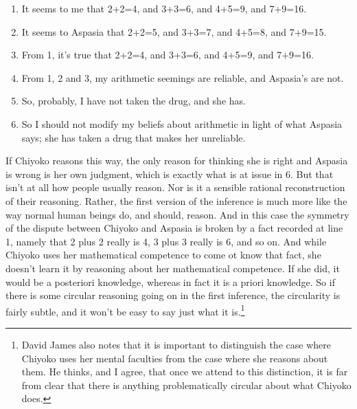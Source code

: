 \begin{enumerate}
\item{} It seems to me that 2+2=4, and 3+3=6, and 4+5=9, and 7+9=16.

\item{} It seems to \gls{Aspasia} that 2+2=5, and 3+3=7, and 4+5=8, and 7+9=15.

\item{} From 1, it's true that 2+2=4, and 3+3=6, and 4+5=9, and 7+9=16.

\item{} From 1, 2 and 3, my arithmetic seemings are reliable, and \gls{Aspasia}'s are not.

\item{} So, probably, I have not taken the drug, and she has.

\item{} So I should not modify my beliefs about arithmetic in light of what \gls{Aspasia} says; she has taken a drug that makes her unreliable.

\end{enumerate}
If \gls{Chiyoko} reasons this way, the only reason for thinking she is right and \gls{Aspasia} is wrong is her own judgment, which is exactly what is at issue in 6. But that isn't at all how people usually reason. Nor is it a sensible rational reconstruction of their reasoning. Rather, the first version of the inference is much more like the way normal human beings do, and should, reason. And in this case the symmetry of the dispute between \gls{Chiyoko} and \gls{Aspasia} is broken by a fact recorded at line 1, namely that 2 plus 2 really is 4, 3 plus 3 really is 6, and so on. And while \gls{Chiyoko} uses her mathematical competence to come ot know that fact, she doesn't learn it by reasoning about her mathematical competence. If she did, it would be a posteriori knowledge, whereas in fact it is a priori knowledge. So if there is some circular reasoning going on in the first inference, the circularity is fairly subtle, and it won't be easy to say just what it is.\footnote{David James \citet{Barnett2014} also notes that it is important to distinguish the case where Chiyoko uses her mental faculties from the case where she reasons about them. He thinks, and I agree, that once we attend to this distinction, it is far from clear that there is anything problematically circular about what Chiyoko does.}

